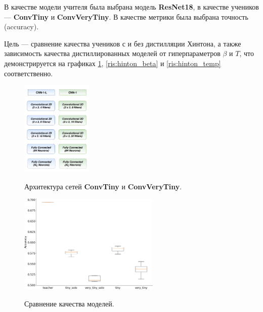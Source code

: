 \documentclass[14]{article}
\begin{document}
В качестве модели учителя была выбрана модель \textbf{ResNet18},
в качестве учеников --- \textbf{ConvTiny} и \textbf{ConvVeryTiny}.
В качестве метрики была выбрана точность (accuracy).

Цель --- сравнение качества учеников с и без дистилляции Хинтона, а также зависимость качества
дистиллированных моделей от гиперпараметров $\beta$ и $T$, что демонстрируется на графиках \ref{ris:hinton_box},
\ref{ris:hinton_beta} и \ref{ris:hinton_temp} соответственно.

\begin{figure}[h]
  \begin{multicols}{2}
    \includegraphics[width=0.3\textwidth]{../figures/conv_scheme.png}
    \hfill
    \caption{Архитектура сетей \textbf{ConvTiny} и \textbf{ConvVeryTiny}.}
    \label{ris:conv_architecture}
    \hfill
    \includegraphics[width=0.6\textwidth]{../figures/box_hinton_model_accuracy.png}
    \hfill
    \caption{Сравнение качества моделей.}
    \label{ris:hinton_box}
  \end{multicols}
\end{figure}
\end{document}
